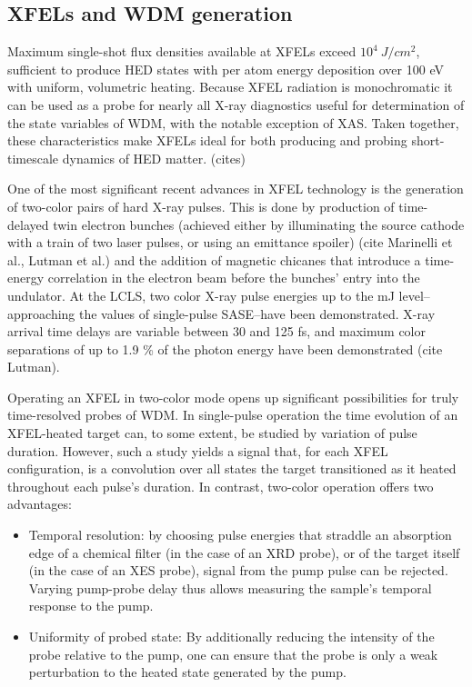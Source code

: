 \documentclass [11pt, proquest, article] {uwthesis}[2016/11/22]
\begin{document}


\subsection{XFELs and WDM generation}
Maximum single-shot flux densities available at XFELs exceed $10^4~J/cm^2$, sufficient to produce HED states with per atom energy deposition over 100 eV with uniform, volumetric heating.  Because XFEL radiation is monochromatic it can be used as a probe for nearly all X-ray diagnostics useful for determination of the state variables of WDM, with the notable exception of XAS.  Taken together, these characteristics make XFELs ideal for both producing and probing short-timescale dynamics of HED matter. (cites)

One of the most significant recent advances in XFEL technology is the generation of two-color pairs of hard X-ray pulses. This is done by production of time-delayed twin electron bunches (achieved either by illuminating the source cathode with a train of two laser pulses, or using an emittance spoiler) (cite Marinelli et al., Lutman et al.) and the addition of magnetic chicanes that introduce a time-energy correlation in the electron beam before the bunches' entry into the undulator. At the LCLS, two color X-ray pulse energies up to the mJ level--approaching the values of single-pulse SASE--have been demonstrated. X-ray arrival time delays are variable between 30 and 125 fs, and maximum color separations of up to 1.9 \% of the photon energy have been demonstrated (cite Lutman).

Operating an XFEL in two-color mode opens up significant possibilities for truly time-resolved probes of WDM. In single-pulse operation the time evolution of an XFEL-heated target can, to some extent, be studied by variation of pulse duration. However, such a study yields a signal that, for each XFEL configuration, is a convolution over all states the target transitioned as it heated throughout each pulse's duration. In contrast, two-color operation offers two advantages:

\begin{itemize}
\item{Temporal resolution: by choosing pulse energies that straddle an absorption edge of a chemical filter (in the case of an XRD probe), or of the target itself (in the case of an XES probe), signal from the pump pulse can be rejected. Varying pump-probe delay thus allows measuring the sample's temporal response to the pump.}
\item{Uniformity of probed state: By additionally reducing the intensity of the probe relative to the pump, one can ensure that the probe is only a weak perturbation to the heated state generated by the pump.}
\end{itemize}
\end{document}
